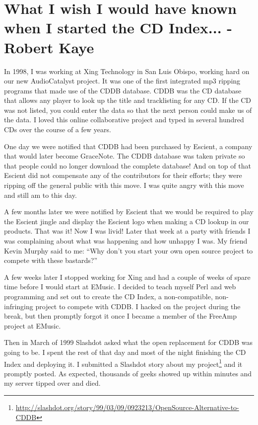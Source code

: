 \chapter{What I wish I would have known when I started the CD Index... - Robert Kaye}
In 1998, I was working at Xing Technology in San Luis Obispo, working hard on our new AudioCatalyst project. It was one of the first integrated mp3 ripping programs that made use of the CDDB database. CDDB was the CD database that allows any player to look up the title and tracklisting for any CD. If the CD was not listed, you could enter the data so that the next person could make us of the data. I loved this online collaborative project and typed in several hundred CDs over the course of a few years.

One day we were notified that CDDB had been purchased by Escient, a company that would later become GraceNote. The CDDB database was taken private so that people could no longer download the complete database! And on top of that Escient did not compensate any of the contributors for their efforts; they were ripping off the general public with this move. I was quite angry with this move and still am to this day.

A few months later we were notified by Escient that we would be required to play the Escient jingle and display the Escient logo when making a CD lookup in our products. That was it! Now I was livid! Later that week at a party with friends I was complaining about what was happening and how unhappy I was. My friend Kevin Murphy said to me: ``Why don’t you start your own open source project to compete with these bastards?''

A few weeks later I stopped working for Xing and had a couple of weeks of spare time before I would start at EMusic. I decided to teach myself Perl and web programming and set out to create the CD Index, a non-compatible, non-infringing project to compete with CDDB. I hacked on the project during the break, but then promptly forgot it once I became a member of the FreeAmp project at EMusic.

Then in March of 1999 Slashdot asked what the open replacement for CDDB was going to be. I spent the rest of that day and most of the night finishing the CD Index and deploying it. I submitted a Slashdot story about my project\footnote{\url{http://slashdot.org/story/99/03/09/0923213/OpenSource-Alternative-to-CDDB}} and it promptly posted. As expected, thousands of geeks showed up within minutes and my server tipped over and died.

